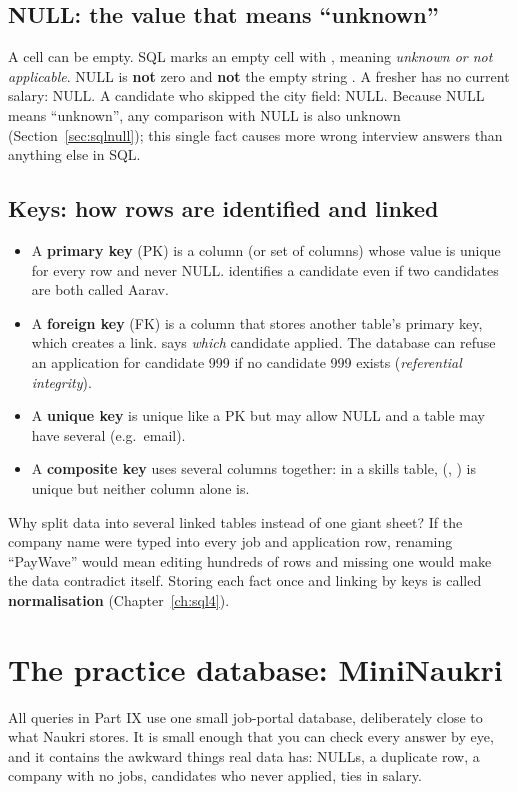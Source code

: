 \subsection{NULL: the value that means ``unknown''}
A cell can be empty. SQL marks an empty cell with , meaning \emph{unknown or not applicable}. NULL is \textbf{not} zero and \textbf{not} the
empty string . A fresher has no current salary: NULL. A candidate who skipped the city field: NULL. Because NULL means ``unknown'', any
comparison with NULL is also unknown (Section~\ref{sec:sqlnull}); this single fact causes more wrong interview answers than anything else in SQL.

\subsection{Keys: how rows are identified and linked}
\begin{itemize}
\item A \textbf{primary key} (PK) is a column (or set of columns) whose value is unique for every row and never NULL.  identifies a
candidate even if two candidates are both called Aarav.
\item A \textbf{foreign key} (FK) is a column that stores another table's primary key, which creates a link.  says
\emph{which} candidate applied. The database can refuse an application for candidate 999 if no candidate 999 exists (\emph{referential integrity}).
\item A \textbf{unique key} is unique like a PK but may allow NULL and a table may have several (e.g.\ email).
\item A \textbf{composite key} uses several columns together: in a skills table, (, ) is unique but neither column alone is.
\end{itemize}
Why split data into several linked tables instead of one giant sheet? If the company name were typed into every job and application row, renaming
``PayWave'' would mean editing hundreds of rows and missing one would make the data contradict itself. Storing each fact once and linking by keys is
called \textbf{normalisation} (Chapter~\ref{ch:sql4}).

\section{The practice database: MiniNaukri}
All queries in Part IX use one small job-portal database, deliberately close to what Naukri stores. It is small enough that you can check every answer by
eye, and it contains the awkward things real data has: NULLs, a duplicate row, a company with no jobs, candidates who never applied, ties in salary.

